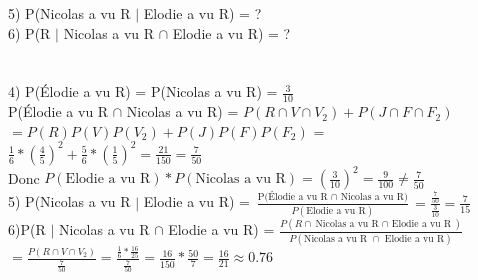 \documentclass{article}
\begin{document}
5) P(Nicolas a vu R $|$ Elodie a vu R) = ?\\
6) P(R $|$ Nicolas a vu R $\cap$ Elodie a vu R) = ?\\
\\ \\
4) P(Élodie a vu R) = P(Nicolas a vu R) = $\frac{3}{10}$\\
P(Élodie a vu R $\cap$ Nicolas a vu R) = $P(R \cap V \cap V_2) + P(J \cap F \cap F_2)$\\
$= P(R) P(V) P(V_2) + P(J) P(F) P(F_2)$ = $\frac{1}{6}*(\frac{4}{5})^2 + \frac{5}{6} * (\frac{1}{5})^2 = \frac{21}{150} = \frac{7}{50}$\\
Donc $P(\mbox{Elodie a vu R}) * P(\mbox{Nicolas a vu R}) = (\frac{3}{10})^2 = \frac{9}{100} \neq \frac{7}{50}$\\
5) P(Nicolas a vu R $|$ Elodie a vu R) = $\frac{\mbox{P(Élodie a vu R $\cap$ Nicolas a vu R)}}{P(\mbox{Elodie a vu R})} = \frac{\frac{7}{50}}{\frac{3}{10}} = \frac{7}{15}$\\
6)P(R $|$ Nicolas a vu R $\cap$ Elodie a vu R) = $\frac{P(R \cap \mbox{Nicolas a vu R $\cap$ Elodie a vu R})}{P(\mbox{Nicolas a vu R $\cap$ Elodie a vu R})}$\\
$= \frac{P(R \cap V \cap V_2)}{\frac{7}{50}} = \frac{\frac{1}{6} * \frac{16}{25}}{\frac{7}{50}} = \frac{16}{150} * \frac{50}{7} = \frac{16}{21} \approx 0.76$
\end{document}
